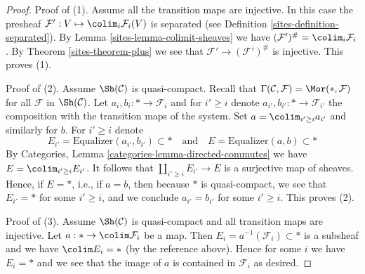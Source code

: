 \begin{proof}

Proof of (1). Assume all the transition maps are injective.
In this case the presheaf
$\mathcal{F}' : V \mapsto \colim_i \mathcal{F}_i(V)$ is
separated (see Definition \ref{sites-definition-separated}).
By Lemma \ref{sites-lemma-colimit-sheaves}
we have
$(\mathcal{F}')^\# = \colim_i \mathcal{F}_i$.
By Theorem \ref{sites-theorem-plus}
we see that $\mathcal{F}' \to (\mathcal{F}')^\#$ is injective.
This proves (1).

\medskip\noindent
Proof of (2). Assume $\Sh(\mathcal{C})$ is quasi-compact. Recall that
$\Gamma(\mathcal{C}, \mathcal{F}) = \Mor(*, \mathcal{F})$
for all $\mathcal{F}$ in $\Sh(\mathcal{C})$.
Let $a_i, b_i : * \to \mathcal{F}_i$ and for
$i' \geq i$ denote $a_{i'}, b_{i'} : * \to \mathcal{F}_{i'}$
the composition with the transition maps of the system.
Set $a = \colim_{i' \geq i} a_{i'}$ and similarly for $b$.
For $i' \geq i$ denote
$$
E_{i'} = \text{Equalizer}(a_{i'}, b_{i'}) \subset *
\quad\text{and}\quad
E = \text{Equalizer}(a, b) \subset *
$$
By Categories, Lemma \ref{categories-lemma-directed-commutes} we have
$E = \colim_{i' \geq i} E_{i'}$. It follows that
$\coprod_{i' \geq i} E_{i'} \to E$
is a surjective map of sheaves. Hence, if $E = *$, i.e., if $a = b$,
then because $*$ is quasi-compact, we see that $E_{i'} = *$ for some
$i' \geq i$, and we conclude $a_{i'} = b_{i'}$ for some $i' \geq i$.
This proves (2).

\medskip\noindent
Proof of (3). Assume $\Sh(\mathcal{C})$ is quasi-compact and all
transition maps are injective. Let $a : * \to \colim \mathcal{F}_i$
be a map. Then $E_i = a^{-1}(\mathcal{F}_i) \subset *$ is a subsheaf
and we have $\colim E_i = *$ (by the reference above). Hence for
some $i$ we have $E_i = *$ and we see that the image of $a$ is
contained in $\mathcal{F}_i$ as desired.


\end{proof}

